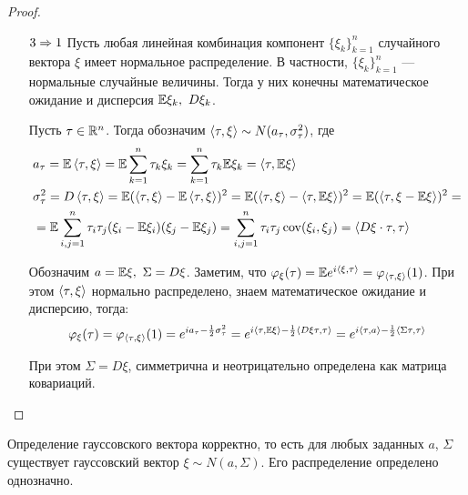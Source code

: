 \begin{proof}
\begin{itemize}
        \item[$3 \Rightarrow 1$] Пусть любая линейная комбинация компонент $\{\xi_k\}_{k = 1}^n$ случайного вектора $\xi$ имеет нормальное распределение. В частности, $\{\xi_k\}_{k = 1}^n$ --- нормальные случайные величины. Тогда у них конечны математическое ожидание и дисперсия $\E\xi_k,\ D\xi_k$.

        Пусть $\tau \in \mathbb{R}^n$. Тогда обозначим $\left\langle\tau, \xi\right\rangle \sim N(a_\tau, \sigma_\tau^2)$, где
        \begin{align*}
            & a_\tau = \mathbb{E} \left\langle\tau, \xi\right\rangle = \mathbb{E}\sum_{k = 1}^n \tau_k \xi_k = \sum_{k = 1}^n \tau_k \mathbb{E}\xi_k = \left\langle\tau, \mathbb{E}\xi\right\rangle
            \\
            & \sigma_\tau^2 = D \left\langle\tau, \xi\right\rangle = \mathbb{E} (\left\langle\tau, \xi\right\rangle - \mathbb{E} \left\langle\tau, \xi\right\rangle)^2 = \mathbb{E} (\left\langle\tau, \xi\right\rangle - \left\langle\tau, \mathbb{E}\xi\right\rangle)^2 = \mathbb{E} (\left\langle\tau, \xi - \mathbb{E}\xi\right\rangle)^2 =
            \\
            & = \mathbb{E}\sum_{i, j = 1}^{n} \tau_i \tau_j (\xi_i - \mathbb{E}\xi_i) (\xi_j - \mathbb{E}\xi_j) = \sum_{i, j = 1}^{n} \tau_i \tau_j \operatorname{cov}(\xi_i, \xi_j) = \left\langle D\xi \cdot \tau, \tau\right\rangle
        \end{align*}

        Обозначим $a = \mathbb{E}\xi,\ \Sigma = D\xi$. Заметим, что $\varphi_\xi(\tau) = \mathbb{E} e^{i \left\langle\xi, \tau\right\rangle} = \varphi_{\left\langle\tau, \xi\right\rangle}(1)$. При этом $\left\langle\tau, \xi\right\rangle$ нормально распределено, знаем математическое ожидание и дисперсию, тогда:
        \[
            \varphi_\xi(\tau) = \varphi_{\left\langle\tau, \xi\right\rangle}(1) = e^{i a_\tau - \frac{1}{2} \sigma_\tau^2} = e^{i \left\langle\tau, \mathbb{E}\xi\right\rangle - \frac{1}{2} \left\langle D\xi \tau, \tau\right\rangle} = e^{i \left\langle\tau, a\right\rangle - \frac{1}{2} \left\langle\Sigma \tau, \tau\right\rangle}
        \]

        При этом $\Sigma = D\xi$, симметрична и неотрицательно определена как матрица ковариаций.
    \end{itemize}
\end{proof}

\begin{corollary}
    Определение гауссовского вектора корректно, то есть для любых заданных $a$, $\Sigma$ существует гауссовский вектор $\xi \sim N(a, \Sigma).$ Его распределение определено однозначно.
\end{corollary}

